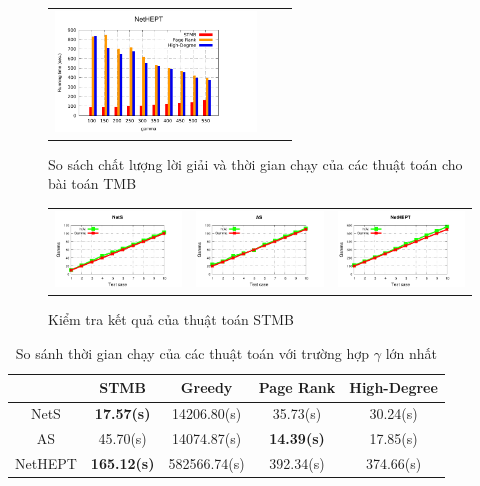 \begin{figure}[H]
\begin{tabular}{lll}
	\includegraphics[height = 3.2cm]{picture/TimeNetHEPT}
\end{tabular}
\caption{So sách chất lượng lời giải và thời gian chạy của các thuật toán cho bài toán TMB}
\label{solSTMB}    
\end{figure}
\begin{figure}[H]
\begin{tabular}{ccc}
	\includegraphics[height = 3.2 cm]{picture/CheckNetS} &
	\includegraphics[height = 3.2 cm]{picture/CheckAS} &   
	\includegraphics[height = 3.2 cm]{picture/CheckNetHEPT}
\end{tabular}
\caption{Kiểm tra kết quả của thuật toán STMB}
\label{check}    
\end{figure}
\begin{table}[h]
\label{tab:time}       %
\begin{center}
	\begin{tabular}{|c|c|c|c|c|}				
		\hline 
		\textbf{} & \textbf{STMB} & \textbf{Greedy} & \textbf{Page Rank} & \textbf{High-Degree} 				
		\\ 
		\hline 
		NetS & \textbf{17.57(s)} &	14206.80(s) &	35.73(s) &	30.24(s)
		\\ 
		\hline 
		AS & 45.70(s) & 14074.87(s) & \textbf{14.39(s)} &	17.85(s)
		\\
		\hline 
		NetHEPT & \textbf{165.12(s)} & 582566.74(s) & 392.34(s) & 374.66(s)
		\\
		\hline 
	\end{tabular}
\end{center}
\caption{So sánh thời gian chạy của các thuật toán với trường hợp $\gamma$ lớn nhất}
\label{timeSTMB}
\end{table}
